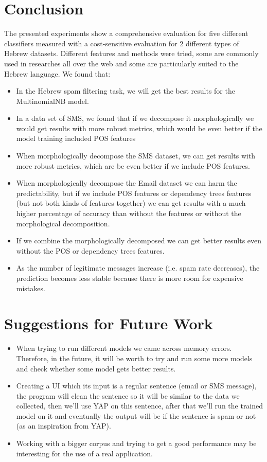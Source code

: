 \documentclass[11pt,a4paper]{article}
\begin{document}
\section{Conclusion}
The presented experiments show a comprehensive evaluation for five different classifiers measured with a cost-sensitive evaluation for 2 different types of Hebrew datasets. Different features and  methods were tried, some are commonly used in researches all over the web and some are particularly suited to the Hebrew language. We found that:
\begin{itemize}
\item In the Hebrew spam filtering task, we will get the best results for the MultinomialNB model.
\item In a data set of SMS, we found that if we decompose it morphologically we would get results with more robust metrics, which would be even better if the model training included POS features
\item When morphologically decompose the SMS dataset, we can get results with more robust metrics, which are be even better if we include POS features.
\item When morphologically decompose the Email dataset we can harm the predictability, but if we include POS features or dependency trees features (but not both kinds of features together) we can get results with a much higher percentage of accuracy than without the features or without the morphological decomposition.
\item If we combine the morphologically decomposed we can get better results even without the POS or dependency trees features.
\item As the number of legitimate messages increase (i.e. spam rate decreases), the prediction becomes less stable because there is more room for expensive mistakes.
\end{itemize}

\section{Suggestions for Future Work}
\begin{itemize}
\item When trying to run different models we came across memory errors. Therefore, in the future, it will be worth to try and run some more models and check whether some model gets better results.
\item Creating a UI which its input is a regular sentence (email or SMS message), the program will clean the sentence so it will be similar to the data we collected, then we'll use YAP on this sentence, after that we'll run the trained model on it and eventually the output will be if the sentence is spam or not (as an inspiration from YAP). 
\item Working with a bigger corpus and trying to get a good performance may be interesting for the use of a real application.
\end{itemize}
\end{document}
